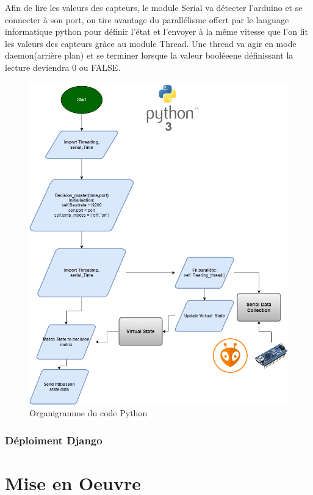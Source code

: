 \documentclass[journal]{IEEEtran}
\begin{document}
Afin de lire les valeurs des capteurs, le module Serial va détecter l'arduino et se connecter à son port, on tire avantage du parallélisme offert par le language informatique python pour 
définir l'état et l'envoyer à la même vitesse que l'on lit les valeurs des capteurs gràce au module Thread. Une thread va agir en mode daemon(arrière plan) et se terminer lorsque la valeur booléeene définissant
la lecture deviendra 0 ou FALSE.

\begin{figure}[htbp]
    \centerline{\includegraphics[scale = 0.3]{Trottoir_Flowchart.drawio.png}}
    \caption{Organigramme du code Python}
    \label{fig4}
\end{figure} 


\subsubsection{Déploiment Django}



\section{Mise en Oeuvre}
\end{document}
